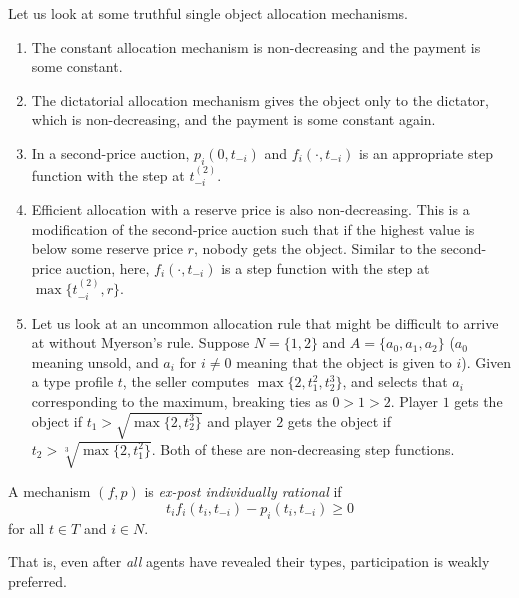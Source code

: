 		\begin{fex}
			Let us look at some truthful single object allocation mechanisms.
			\begin{enumerate}
				\item The constant allocation mechanism is non-decreasing and the payment is some constant.
				\item The dictatorial allocation mechanism gives the object only to the dictator, which is non-decreasing, and the payment is some constant again.
				\item In a second-price auction, $p_i(0,t_{-i})$ and $f_i(\cdot,t_{-i})$ is an appropriate step function with the step at $t_{-i}^{(2)}$.
				\item Efficient allocation with a reserve price is also non-decreasing. This is a modification of the second-price auction such that if the highest value is below some reserve price $r$, nobody gets the object. Similar to the second-price auction, here, $f_i(\cdot,t_{-i})$ is a step function with the step at $\max\{t_{-i}^{(2)},r\}$.
				\item Let us look at an uncommon allocation rule that might be difficult to arrive at without Myerson's rule. Suppose $N = \{1,2\}$ and $A = \{a_0,a_1,a_2\}$ ($a_0$ meaning unsold, and $a_i$ for $i \ne 0$ meaning that the object is given to $i$). Given a type profile $t$, the seller computes $\max\{2,t_1^2,t_2^3\}$, and selects that $a_i$ corresponding to the maximum, breaking ties as $0>1>2$. Player $1$ gets the object if $t_1 > \sqrt{\max\{2,t_2^3\}}$ and player $2$ gets the object if $t_2 > \sqrt[3]{\max\{2,t_1^2\}}$. Both of these are non-decreasing step functions.
			\end{enumerate}
		\end{fex}

		\begin{fdef}
			A mechanism $(f,p)$ is \emph{ex-post individually rational} if
			\[ t_i f_i(t_i,t_{-i}) - p_i(t_i,t_{-i}) \ge 0 \]
			for all $t \in T$ and $i \in N$.
		\end{fdef}
		That is, even after \emph{all} agents have revealed their types, participation is weakly preferred.

